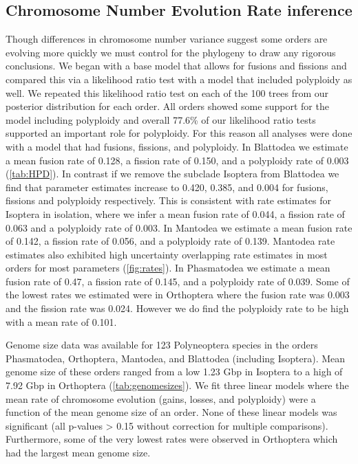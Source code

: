 \subsection{Chromosome Number Evolution Rate inference}
Though differences in chromosome number variance suggest some orders are evolving more quickly we must control for the phylogeny to draw any rigorous conclusions.
We began with a base model that allows for fusions and fissions and compared this via a likelihood ratio test with a model that included polyploidy as well.
We repeated this likelihood ratio test on each of the 100 trees from our posterior distribution for each order.
All orders showed some support for the model including polyploidy and overall 77.6\% of our likelihood ratio tests supported an important role for polyploidy.
For this reason all analyses were done with a model that had fusions, fissions, and polyploidy.
In Blattodea we estimate a mean fusion rate of 0.128, a fission rate of 0.150, and a polyploidy rate of 0.003 (\cref{tab:HPD}).
In contrast if we remove the subclade Isoptera from Blattodea we find that parameter estimates increase to 0.420, 0.385, and 0.004 for fusions, fissions and polyploidy respectively.
This is consistent with rate estimates for Isoptera in isolation, where we infer a mean fusion rate of 0.044, a fission rate of 0.063 and a polyploidy rate of 0.003.
In Mantodea we estimate a mean fusion rate of 0.142, a fission rate of 0.056, and a polyploidy rate of 0.139.
Mantodea rate estimates also exhibited high uncertainty overlapping rate estimates in most orders for most parameters (\cref{fig:rates}).
In Phasmatodea we estimate a mean fusion rate of 0.47, a fission rate of 0.145, and a polyploidy rate of 0.039.
Some of the lowest rates we estimated were in Orthoptera where the fusion rate was 0.003 and the fission rate was 0.024. However we do find the polyploidy rate to be high with a mean rate of 0.101.

Genome size data was available for 123 Polyneoptera species in the orders Phasmatodea, Orthoptera, Mantodea, and Blattodea (including Isoptera).
Mean genome size of these orders ranged from a low 1.23 Gbp in Isoptera to a high of 7.92 Gbp in Orthoptera (\cref{tab:genomesizes}).
We fit three linear models where the mean rate of chromosome evolution (gains, losses, and polyploidy) were a function of the mean genome size of an order.
None of these linear models was significant (all p-values > 0.15 without correction for multiple comparisons).
Furthermore, some of the very lowest rates were observed in Orthoptera which had the largest mean genome size.

